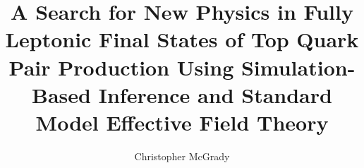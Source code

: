 \documentclass[draft, numrefs, sort&compress, noinfo]{nddiss2e} %
\begin{document}
\frontmatter                        %

\title{A Search for New Physics in Fully Leptonic Final States of Top Quark Pair Production Using Simulation-Based Inference and Standard Model Effective Field Theory}   %

\author{Christopher McGrady}

\maketitle

\makecopyright 



% 

\tableofcontents 
\listoffigures
\listoftables



% 
\mainmatter
\end{document}
